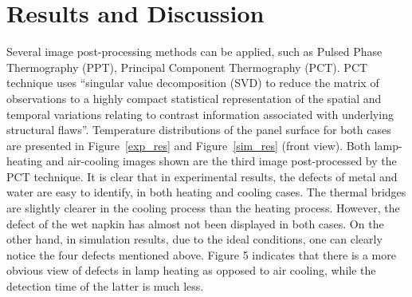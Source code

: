 \documentclass{tQRT2e}
\begin{document}
\section{Results and Discussion}
Several image post-processing methods can be applied, such as Pulsed Phase Thermography (PPT)\cite{Maldague1996}, Principal Component Thermography (PCT)\cite{Rajic2002}. PCT technique uses “singular value decomposition (SVD) to reduce the matrix of observations to a highly compact statistical representation of the spatial and temporal variations relating to contrast information associated with underlying structural flaws”. Temperature distributions of the panel surface for both cases are presented in Figure~\ref{exp_res} and Figure~\ref{sim_res} (front view). Both lamp-heating and air-cooling images shown are the third image post-processed by the PCT technique. It is clear that in experimental results, the defects of metal and water are easy to identify, in both heating and cooling cases. The thermal bridges are slightly clearer in the cooling process than the heating process. However, the defect of the wet napkin has almost not been displayed in both cases. On the other hand, in simulation results, due to the ideal conditions, one can clearly notice the four defects mentioned above. Figure 5 indicates that there is a more obvious view of defects in lamp heating as opposed to air cooling, while the detection time of the latter is much less.
\end{document}
